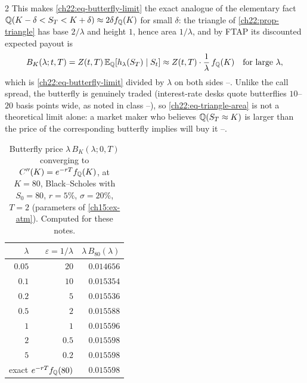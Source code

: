 \begin{paracol}{2}
This makes \eqref{ch22:eq-butterfly-limit} the exact analogue of the elementary fact
$\mathbb{Q}(K-\delta<S_T<K+\delta)\approx2\delta f_{\mathbb{Q}}(K)$ for small $\delta$: the triangle of
\cref{ch22:prop-triangle} has base $2/\lambda$ and height $1$, hence area $1/\lambda$, and by FTAP its
discounted expected payout is
\begin{equation}\label{ch22:eq-triangle-area}
  B_K(\lambda;t,T) = Z(t,T)\,\mathbb{E}_{\mathbb{Q}}[h_\lambda(S_T)\mid S_t] \approx Z(t,T)\cdot\frac1\lambda\, f_{\mathbb{Q}}(K)
  \quad\text{for large }\lambda,
\end{equation}
which is \eqref{ch22:eq-butterfly-limit} divided by $\lambda$ on both sides
--. Unlike the call spread, the butterfly is genuinely traded
(interest-rate desks quote butterflies $10$--$20$ basis points wide, as noted in class
--), so \eqref{ch22:eq-triangle-area} is not a theoretical limit
alone: a market maker who believes $\mathbb{Q}(S_T\approx K)$ is larger than the price of the corresponding
butterfly implies will buy it --.

\begin{table}[ht]
\centering
\caption{Butterfly price $\lambda\,B_K(\lambda;0,T)$ converging to $C''(K)=e^{-rT}f_{\mathbb{Q}}(K)$, at $K=80$,
Black--Scholes with $S_0=80$, $r=5\%$, $\sigma=20\%$, $T=2$ (parameters of \cref{ch15:ex-atm}).
Computed for these notes.}\label{ch22:tab-butterfly}
\begin{tabular}{@{}rrr@{}}
\toprule
$\lambda$ & $\varepsilon=1/\lambda$ & $\lambda\,B_{80}(\lambda)$\\
\midrule
$0.05$ & $20$   & $0.014656$\\
$0.1$  & $10$   & $0.015354$\\
$0.2$  & $5$    & $0.015536$\\
$0.5$  & $2$    & $0.015588$\\
$1$    & $1$    & $0.015596$\\
$2$    & $0.5$  & $0.015598$\\
$5$    & $0.2$  & $0.015598$\\
\midrule
\multicolumn{2}{r}{exact $e^{-rT}f_{\mathbb{Q}}(80)$} & $0.015598$\\
\bottomrule
\end{tabular}
\end{table}


\end{paracol}
